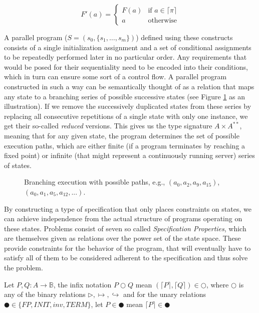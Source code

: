 \begin{equation}
    F'(a) = 
    \left\{
    	\begin{array}{ll}
    		F(a) & \mbox{if } a \in \lceil \pi \rceil \\
    		a & \mbox{otherwise}
    	\end{array}
    \right.
\end{equation}

A parallel program ($S = (s_0, \{s_1, \ldots, s_m\})$) defined using these constructs consists of a single initialization assignment and a set of conditional assignments to be repeatedly performed later in no particular order. Any requirements that would be posed for their sequentiality need to be encoded into their conditions, which in turn can ensure some sort of a control flow. A parallel program constructed in such a way can be semantically thought of as a relation that maps any state to a branching series of possible successive states (see Figure \ref{fig:branching-execution} as an illustration). If we remove the successively duplicated states from these series by replacing all consecutive repetitions of a single state with only one instance, we get their so-called \textit{reduced} versions. This gives us the type signature $A \times A^{**}$, meaning that for any given state, the program determines the set of possible execution paths, which are either finite (if a program terminates by reaching a fixed point) or infinite (that might represent a continuously running server) series of states.

\begin{figure}[H]
    \centering
    
    \caption{Branching execution with possible paths, e.g., $(a_0,a_2,a_9,a_{15})$, $(a_0,a_1,a_5,a_{12},...)$.}
    \label{fig:branching-execution}
\end{figure}

By constructing a type of specification that only places constraints on states, we can achieve independence from the actual structure of programs operating on these states. Problems consist of seven so called \textit{Specification Properties}, which are themselves given as relations over the power set of the state space. These provide constraints for the behavior of the program, that will eventually have to satisfy all of them to be considered adherent to the specification and thus solve the problem.

Let $P, Q : A \to \mathbb{B}$, the infix notation $P \Circle Q$ mean $(\lceil P
\rceil , \lceil Q \rceil) \in \Circle$, where $\Circle$ is any of the binary
relations $\rhd, \mapsto, \hookrightarrow$ and for the unary relations $\CIRCLE
\in \{FP, INIT, inv, TERM\}$, let $P \in \CIRCLE$ mean $\lceil P \rceil \in
\CIRCLE$

